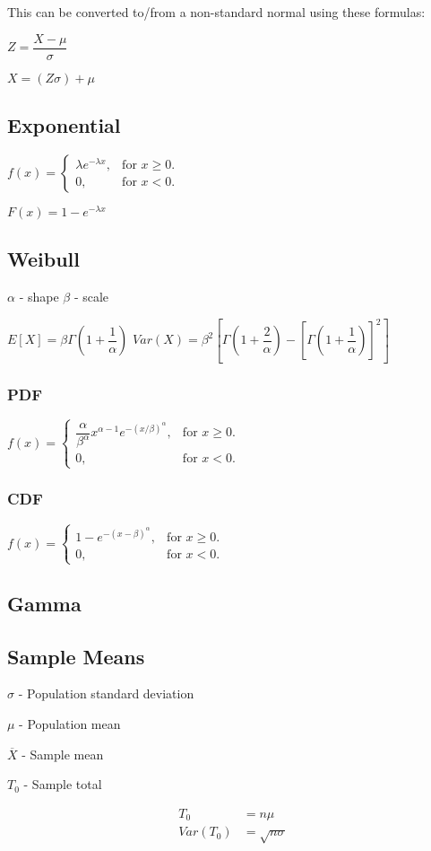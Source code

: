 \documentclass[12pt,fleqn]{article}
\begin{document}
This can be converted to/from a non-standard normal using these formulas:

$Z = \dfrac{X-\mu}{\sigma}$


$X = (Z \sigma) + \mu$


\subsection{Exponential}


$
f(x)=\begin{cases}
\lambda e^{-\lambda x}, & \text{for $x\ge0$}.\\
0, & \text{for $x<0$}.
\end{cases}
$

$ F(x)=1-e^{-\lambda x} $


\subsection{Weibull}

$\alpha$ - shape
$\beta$ - scale

$E[X] = \beta\Gamma(1+\dfrac{1}{\alpha})$
$Var(X) = \beta^2[\Gamma(1+\dfrac{2}{\alpha})-[\Gamma(1+\dfrac{1}{\alpha})]^2]$

\subsubsection{PDF}

$
f(x)=\begin{cases}
\dfrac{\alpha}{\beta^\alpha}x^{\alpha-1}e^{-(x/\beta)^\alpha}, & \text{for $x\ge0$}.\\
0, & \text{for $x<0$}.
\end{cases}
$

\subsubsection{CDF}

$
f(x)=\begin{cases}
1-e^{-(x-\beta)^\alpha}, & \text{for $x\ge0$}.\\
0, & \text{for $x<0$}.
\end{cases}
$


\subsection{Gamma}


\subsection{Sample Means}

$\sigma$ - Population standard deviation

$\mu$ - Population mean

$\overline{X}$ - Sample mean

$T_0$ - Sample total

\begin{align*}
T_0 &= n\mu\\
Var(T_0) &= \sqrt{n\sigma}
\end{align*}
\end{document}
